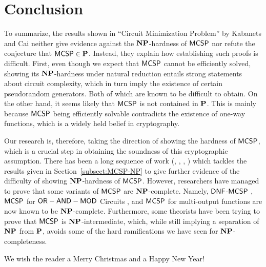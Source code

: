 \documentclass[11pt]{article}
\begin{document}
\section{Conclusion}


To summarize, the results shown in ``Circuit Minimization Problem'' by Kabanets and Cai neither give evidence against the $\NP$-hardness of $\mathprob{MCSP}$ nor refute the conjecture that $\mathprob{MCSP} \in \P$. Instead, they explain how
establishing such proofs is difficult.
%
%
First, even though we expect that $\mathprob{MCSP}$ cannot be efficiently solved,
showing its $\NP$-hardness under natural reduction entails strong statements
about circuit complexity, which in turn imply the existence of certain
pseudorandom generators. Both of which are known to be difficult to obtain.
%
On the other hand, it seems likely that $\mathprob{MCSP}$ is not contained in $\P$.
This is mainly because $\mathprob{MCSP}$ being efficiently solvable contradicts
the existence of one-way functions, which is a widely held belief in cryptography.

Our research is, therefore, taking the direction of showing the hardness of $\mathprob{MCSP}$, which is a crucial step in obtaining the soundness of
this cryptographic assumption.
%
There has been a long sequence of work (\cite{hitchcock2015np}, \cite{allender2017minimum}, \cite{murray2017non}, \cite{allender2019new}) which tackles the results given in Section~\ref{subsect:MCSP-NP} to give further evidence of the difficulty of showing $\NP$-hardness of $\mathprob{MCSP}$. However, researchers have managed to prove that some variants of $\mathprob{MCSP}$ are $\NP$-complete. Namely, $\mathprob{DNF}$-$\mathprob{MCSP}$ \cite{masek1979some}, $\mathprob{MCSP}$ for
$\mathprob{OR-AND-MOD}$ Circuits \cite{hirahara2018np}, and $\mathprob{MCSP}$ for multi-output functions \cite{ilango2020np} are now known to be $\NP$-complete. Furthermore, some theorists have been trying to prove that $\mathprob{MCSP}$ is $\NP$-intermediate, which, while still implying a separation of $\NP$ from $\P$,
avoids some of the hard ramifications we have seen for $\NP$-completeness.

We wish the reader a Merry Christmas and a Happy New Year!



\end{document}
